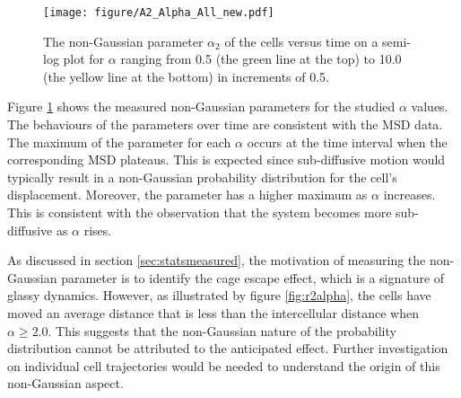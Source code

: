 \documentclass[a4paper,12pt]{article}
\begin{document}
\begin{figure}[h]
\centering
\texttt{[image: figure/A2\_Alpha\_All\_new.pdf]}
\caption{The non-Gaussian parameter $\alpha_2$ of the cells versus time on a semi-log plot for $\alpha$ ranging from 0.5 (the green line at the top) to 10.0 (the yellow line at the bottom) in increments of 0.5.}
\label{fig:a2alpha}
\end{figure}

Figure \ref{fig:a2alpha} shows the measured non-Gaussian parameters for the studied $\alpha$ values. The behaviours of the parameters over time are consistent with the MSD data. The maximum of the parameter for each $\alpha$ occurs at the time interval when the corresponding MSD plateaus. This is expected since sub-diffusive motion would typically result in a non-Gaussian probability distribution for the cell's displacement. Moreover, the parameter has a higher maximum as $\alpha$ increases. This is consistent with the observation that the system becomes more sub-diffusive as $\alpha$ rises. 

As discussed in section \ref{sec:statsmeasured}, the motivation of measuring the non-Gaussian parameter is to identify the cage escape effect, which is a signature of glassy dynamics. However, as illustrated by figure \ref{fig:r2alpha}, the cells have moved an average distance that is less than the intercellular distance when $\alpha \ge 2.0$. This suggests that the non-Gaussian nature of the probability distribution cannot be attributed to the anticipated effect. Further investigation on individual cell trajectories would be needed to understand the origin of this non-Gaussian aspect. 
\end{document}

